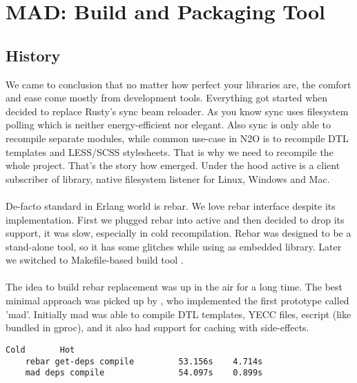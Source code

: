 \section{MAD: Build and Packaging Tool}

\subsection{History}

We came to conclusion that no matter how perfect your libraries are,
the comfort and ease come mostly from development tools.
Everything got started when  decided to
replace Rusty's sync beam reloader. As you know sync uses
filesystem polling which is neither energy-efficient nor elegant. Also
sync is only able to recompile separate modules, while
common use-case in N2O is to recompile DTL templates
and LESS/SCSS stylesheets. That is why we need to recompile
the whole project. That's the story how  emerged.
Under the hood active is a client subscriber
of  library, native filesystem listener for Linux, Windows and Mac.

\paragraph{}
De-facto standard in Erlang world is rebar.
We love rebar interface despite its implementation.
First we plugged rebar into active and then decided to drop its support,
it was slow, especially in cold recompilation.
Rebar was designed to be a stand-alone tool, so it has some
glitches while using as embedded library.
Later we switched to Makefile-based build tool .

\paragraph{}
The idea to build rebar replacement was up in the air for a long time.
The best minimal approach was picked up by ,
who implemented the first prototype called 'mad'. Initially mad
was able to compile DTL templates, YECC files, escript (like
bundled in gproc), and it also had support for caching with side-effects.

\vspace{1\baselineskip}
\begin{lstlisting}[caption=Example of building N2O sample]
                                   Cold       Hot
    rebar get-deps compile         53.156s    4.714s
    mad deps compile               54.097s    0.899s
\end{lstlisting}
\vspace{1\baselineskip}

